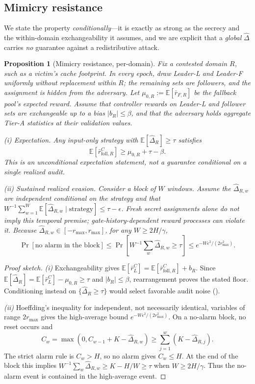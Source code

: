 \documentclass{article}
\newtheorem{proposition}{Proposition}
\newcommand{\dhat}{\hat{\Delta}}
\newcommand{\rmax}{r_{\max}}
\begin{document}
\subsection{Mimicry resistance}
We state the property \emph{conditionally}---it is exactly as strong as the
secrecy and the within-domain exchangeability it assumes, and we are explicit
that a \emph{global} $\dhat$ carries \emph{no} guarantee against a redistributive
attack.

\begin{proposition}[Mimicry resistance, per-domain]\label{prop:mimicry}
Fix a contested domain $R$, such as a victim's cache footprint. In every epoch,
draw Leader-L and Leader-F uniformly without replacement within $R$; the remaining
sets are followers, and the assignment is hidden from the adversary. Let
$\mu_{0,R}:=\mathbb{E}[\bar r_{F,R}]$ be the fallback pool's expected reward.
Assume that controller rewards on Leader-L and follower sets are exchangeable up
to a bias $|b_R|\le\beta$, and that the adversary holds aggregate Tier-A
statistics at their validation values.

\emph{(i) Expectation.} Any input-only strategy with
$\mathbb{E}[\dhat_R]\ge\tau$ satisfies
\[
\mathbb{E}[\bar r_{\mathrm{foll},R}^{C}]
\ge \mu_{0,R}+\tau-\beta .
\]
This is an unconditional expectation statement, not a guarantee conditional on a
single realized audit.

\emph{(ii) Sustained realized evasion.} Consider a block of $W$ windows. Assume
the $\dhat_{R,w}$ are independent conditional on the strategy and that
$W^{-1}\sum_{w=1}^{W}\mathbb{E}[\dhat_{R,w}\mid\text{strategy}]
\le\tau-\epsilon$. Fresh secret assignments alone do not imply this temporal
premise; gate-history-dependent reward processes can violate it. Because
$\dhat_{R,w}\in[-\rmax,\rmax]$, for any $W\ge2H/\gamma$,
\[
\Pr[\text{no alarm in the block}]
\le \Pr[W^{-1}\textstyle\sum_w\dhat_{R,w}\ge\tau]
\le e^{-W\epsilon^2/(2r_{\max}^2)} .
\]
\end{proposition}
\begin{proof}[Proof sketch]
\emph{(i)} Exchangeability gives
$\mathbb{E}[\bar r_L^C]=
\mathbb{E}[\bar r_{\mathrm{foll},R}^{C}]+b_R$. Since
$\mathbb{E}[\dhat_R]=\mathbb{E}[\bar r_L^C]-\mu_{0,R}\ge\tau$ and
$|b_R|\le\beta$, rearrangement proves the stated floor. Conditioning instead on
$\{\dhat_R\ge\tau\}$ would select favorable audit noise
().

\emph{(ii)} Hoeffding's inequality for independent, not necessarily identical,
variables of range $2\rmax$ gives the high-average bound
$e^{-W\epsilon^2/(2\rmax^2)}$. On a no-alarm block, no reset occurs and
\[
C_w=\max(0,C_{w-1}+K-\dhat_{R,w})
\ge\sum_{j=1}^{w}(K-\dhat_{R,j}).
\]
The strict alarm rule is $C_w>H$, so no alarm gives $C_w\le H$. At the end of
the block this implies
$W^{-1}\sum_w\dhat_{R,w}\ge K-H/W\ge\tau$ when $W\ge2H/\gamma$.
Thus the no-alarm event is contained in the high-average event.
\end{proof}
\end{document}
